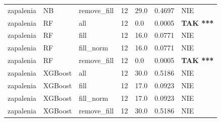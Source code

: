\begin{table}[htbp]
\begin{tabular}{lllrlll}
zapalenia & NB & remove_fill & 12 & 29.0 & 0.4697 & NIE \\
zapalenia & RF & all & 12 & 0.0 & 0.0005 & \textbf{TAK ***} \\
zapalenia & RF & fill & 12 & 16.0 & 0.0771 & NIE \\
zapalenia & RF & fill_norm & 12 & 16.0 & 0.0771 & NIE \\
zapalenia & RF & remove_fill & 12 & 0.0 & 0.0005 & \textbf{TAK ***} \\
zapalenia & XGBoost & all & 12 & 30.0 & 0.5186 & NIE \\
zapalenia & XGBoost & fill & 12 & 17.0 & 0.0923 & NIE \\
zapalenia & XGBoost & fill_norm & 12 & 17.0 & 0.0923 & NIE \\
zapalenia & XGBoost & remove_fill & 12 & 30.0 & 0.5186 & NIE \\
\bottomrule
\end{tabular}
\end{table}
